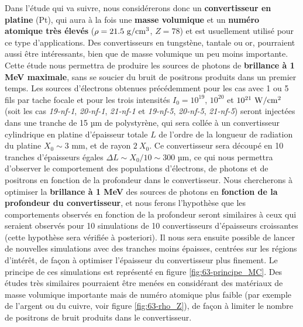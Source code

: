 \begin{refsection}
Dans l'étude qui va suivre, nous considérerons donc un \textbf{convertisseur en platine} (Pt), qui aura à la fois une \textbf{masse volumique} et un \textbf{numéro atomique très élevés} ($\rho=21.5 ~ \rm g/cm^3$, $Z=78$) et est usuellement utilisé pour ce type d'applications. Des convertisseurs en tungstène, tantale ou or, pourraient aussi être intéressants, bien que de masse volumique un peu moins importante. Cette étude nous permettra de produire les sources de photons de \textbf{brillance à 1 MeV maximale}, sans se soucier du bruit de positrons produits dans un premier temps. Les sources d'électrons obtenues précédemment pour les cas avec 1 ou 5 fils par tache focale et pour les trois intensités  $I_0=10^{19}$, $10^{20}$ et $10^{21} ~ \rm W/cm^2$ (soit les cas \textit{19-nf-1}, \textit{20-nf-1}, \textit{21-nf-1} et \textit{19-nf-5}, \textit{20-nf-5}, \textit{21-nf-5}) seront injectées dans une tranche de 15 µm de polystyrène, qui sera collée à un convertisseur cylindrique en platine d'épaisseur totale $L$ de l'ordre de la longueur de radiation du platine $X_0 \sim 3$ mm, et de rayon $2 ~ X_0$. Ce convertisseur sera découpé en 10 tranches d'épaisseurs égales $\Delta L \sim X_0/10 \sim 300$ µm, ce qui nous permettra d'observer le comportement des populations d'électrons, de photons et de positrons en fonction de la profondeur dans le convertisseur. Nous chercherons à optimiser la \textbf{brillance à 1 MeV} des sources de photons en \textbf{fonction de la profondeur du convertisseur}, et nous ferons l'hypothèse que les comportements observés en fonction de la profondeur seront similaires à ceux qui seraient observés pour 10 simulations de 10 convertisseurs d'épaisseurs croissantes (cette hypothèse sera vérifiée à posteriori). Il nous sera ensuite possible de lancer de nouvelles simulations avec des tranches moins épaisses, centrées sur les régions d'intérêt, de façon à optimiser l'épaisseur du convertisseur plus finement. Le principe de ces simulations est représenté en figure \ref{fig:63-principe_MC}. Des études très similaires pourraient être menées en considérant des matériaux de masse volumique importante mais de numéro atomique plus faible (par exemple de l'argent ou du cuivre, voir figure \ref{fig:63-rho_Z}), de façon à limiter le nombre de positrons de bruit produits dans le convertisseur.


\end{refsection}
